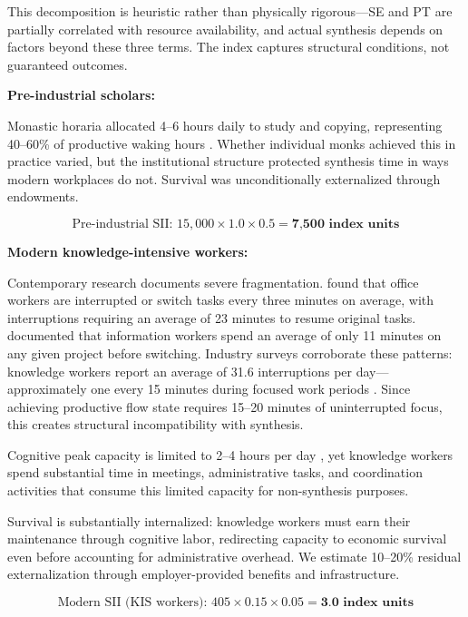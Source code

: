 This decomposition is heuristic rather than physically rigorous---SE and PT are partially correlated with resource availability, and actual synthesis depends on factors beyond these three terms. The index captures structural conditions, not guaranteed outcomes.

\textbf{Pre-industrial scholars:}

Monastic horaria allocated 4--6 hours daily to study and copying, representing 40--60\% of productive waking hours \citep{knowles1963}. Whether individual monks achieved this in practice varied, but the institutional structure protected synthesis time in ways modern workplaces do not. Survival was unconditionally externalized through endowments.

\begin{equation}
\text{Pre-industrial SII: } 15,000 \times 1.0 \times 0.5 = \textbf{7,500 index units}
\end{equation}

\textbf{Modern knowledge-intensive workers:}

Contemporary research documents severe fragmentation. \citet{mark2008} found that office workers are interrupted or switch tasks every three minutes on average, with interruptions requiring an average of 23 minutes to resume original tasks. \citet{gonzalez2004} documented that information workers spend an average of only 11 minutes on any given project before switching. Industry surveys corroborate these patterns: knowledge workers report an average of 31.6 interruptions per day---approximately one every 15 minutes during focused work periods \citep{reclaimai2024}. Since achieving productive flow state requires 15--20 minutes of uninterrupted focus, this creates structural incompatibility with synthesis.

Cognitive peak capacity is limited to 2--4 hours per day \citep{ericsson1993}, yet knowledge workers spend substantial time in meetings, administrative tasks, and coordination activities that consume this limited capacity for non-synthesis purposes.

Survival is substantially internalized: knowledge workers must earn their maintenance through cognitive labor, redirecting capacity to economic survival even before accounting for administrative overhead. We estimate 10--20\% residual externalization through employer-provided benefits and infrastructure.

\begin{equation}
\text{Modern SII (KIS workers): } 405 \times 0.15 \times 0.05 = \textbf{3.0 index units}
\end{equation}

